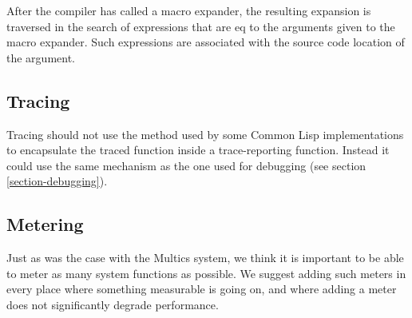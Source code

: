 \documentclass{article}
\begin{document}
After the compiler has called a macro expander, the resulting
expansion is traversed in the search of expressions that are eq to the
arguments given to the macro expander.  Such expressions are
associated with the source code location of the argument. 

\subsection{Tracing}

Tracing should not use the method used by some Common Lisp
implementations to encapsulate the traced function inside a
trace-reporting function.  Instead it could use the same mechanism as
the one used for debugging (see section \ref{section-debugging}). 

\subsection{Metering}

Just as was the case with the Multics system, we think it is important
to be able to meter as many system functions as possible.  We suggest
adding such meters in every place where something measurable is going
on, and where adding a meter does not significantly degrade
performance.  
\end{document}
